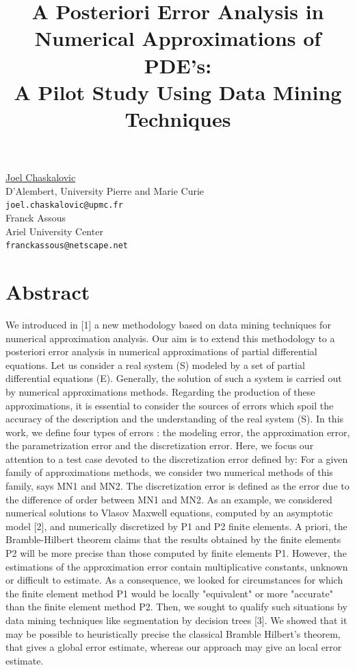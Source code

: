 \documentclass[article, A4, 11pt]{llncs}%
\begin{document}
\title{A Posteriori Error Analysis in Numerical Approximations of PDE's: \\A Pilot Study Using Data Mining Techniques}
 \author{} \institute{}
\maketitle
\begin{center}
{\large \underline{Joel Chaskalovic}}\\
D'Alembert, University Pierre and Marie Curie\\
{\tt joel.chaskalovic@upmc.fr}
\\ \vspace{4mm}
{\large Franck Assous}\\
Ariel University Center\\
{\tt franckassous@netscape.net}
\end{center}

\section*{Abstract}
We introduced in [1] a new methodology based on data mining techniques for numerical approximation analysis. Our aim is to extend this methodology to a posteriori error analysis in numerical approximations of partial differential equations. Let us consider a real system (S) modeled by a set of partial differential equations (E). Generally, the solution of such a system is carried out by numerical approximations methods. Regarding the production of these approximations, it is essential to consider the sources of errors which spoil the accuracy of the description and the understanding of the real system (S). In this work, we define four types of errors : the modeling error, the approximation error, the parametrization error and the discretization error. Here, we focus our attention to a test case devoted to the discretization error defined by: For a given family of approximations methods, we consider two numerical methods of this family, says MN1 and MN2. The discretization error is defined as the error due to the difference of order between MN1 and MN2. As an example, we considered numerical solutions to Vlasov Maxwell equations, computed by an asymptotic model [2], and numerically discretized by P1 and P2 finite elements. A priori, the Bramble-Hilbert theorem claims that the results obtained by the finite elements P2 will be more precise than those computed by finite elements P1. However, the estimations of the approximation error contain multiplicative constants, unknown or difficult to estimate. As a consequence, we looked for circumstances for which the finite element method P1 would be locally "equivalent" or more "accurate" than the finite element method P2. Then, we sought to qualify such situations by data mining techniques like segmentation by decision trees [3]. We showed that it may  be possible to heuristically precise the classical Bramble Hilbert's theorem, that gives a global error estimate, whereas our approach may give an local error estimate.
\end{document}
